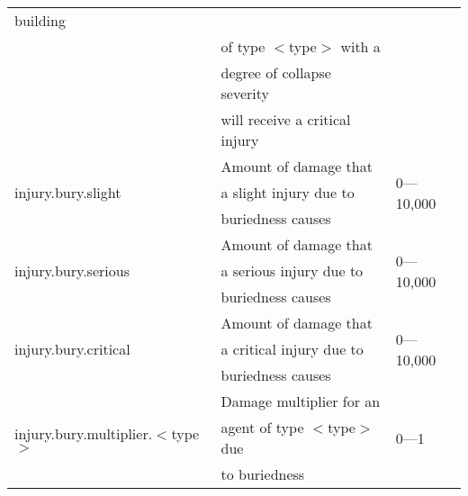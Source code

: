 \documentclass{article}
\begin{document}
\begin{table}[htb]
\begin{tabular}{lll}
  building                              & \\
                                                            & of type $<$type$>$
  with a                                & \\
                                                            & degree of collapse
  severity                              & \\
                                                            & will receive a
  critical injury                       & \\
  \hline
  \multirow{3}{*}{injury.bury.slight}                       & Amount of damage
  that                                  & \multirow{3}{*}{0---10,000}\\
                                                            & a slight injury
  due to                                & \\
                                                            & buriedness causes
                                        & \\
  \hline
  \multirow{3}{*}{injury.bury.serious}                      & Amount of damage
  that                                  & \multirow{3}{*}{0---10,000}\\
                                                            & a serious injury
  due to                                & \\
                                                            & buriedness causes
                                        & \\
  \hline
  \multirow{3}{*}{injury.bury.critical}                     & Amount of damage
  that                                  & \multirow{3}{*}{0---10,000}\\
                                                            & a critical injury
  due to                                & \\
                                                            & buriedness causes
                                        & \\
  \hline
  \multirow{3}{*}{injury.bury.multiplier.$<$type$>$}        & Damage multiplier
  for an                                & \multirow{3}{*}{0---1}\\
                                                            & agent of type
  $<$type$>$ due                        & \\
                                                            & to buriedness
                                        & \\

\end{tabular}
\end{table}
\end{document}
